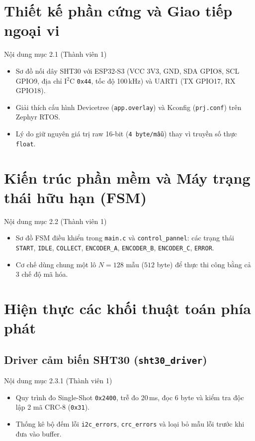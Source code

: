 \documentclass[12pt,a4paper]{report}
\begin{document}
\section{Thiết kế phần cứng và Giao tiếp ngoại vi}
\begin{notebox}{Nội dung mục 2.1 (Thành viên 1)}
\begin{itemize}[leftmargin=*,nosep]
    \item Sơ đồ nối dây SHT30 với ESP32-S3 (VCC 3V3, GND, SDA GPIO8, SCL GPIO9, địa chỉ I$^2$C \texttt{0x44}, tốc độ 100\,kHz) và UART1 (TX GPIO17, RX GPIO18).
    \item Giải thích cấu hình Devicetree (\texttt{app.overlay}) và Kconfig (\texttt{prj.conf}) trên Zephyr RTOS.
    \item Lý do giữ nguyên giá trị raw 16-bit (\texttt{4 byte/mẫu}) thay vì truyền số thực \texttt{float}.
\end{itemize}
\end{notebox}

\section{Kiến trúc phần mềm và Máy trạng thái hữu hạn (FSM)}
\begin{notebox}{Nội dung mục 2.2 (Thành viên 1)}
\begin{itemize}[leftmargin=*,nosep]
    \item Sơ đồ FSM điều khiển trong \texttt{main.c} và \texttt{control\_pannel}: các trạng thái \texttt{START}, \texttt{IDLE}, \texttt{COLLECT}, \texttt{ENCODER\_A}, \texttt{ENCODER\_B}, \texttt{ENCODER\_C}, \texttt{ERROR}.
    \item Cơ chế dùng chung một lô $N=128$ mẫu ($512$ byte) để thực thi công bằng cả 3 chế độ mã hóa.
\end{itemize}
\end{notebox}

\section{Hiện thực các khối thuật toán phía phát}
\subsection{Driver cảm biến SHT30 (\texttt{sht30\_driver})}
\begin{notebox}{Nội dung mục 2.3.1 (Thành viên 1)}
\begin{itemize}[leftmargin=*,nosep]
    \item Quy trình đo Single-Shot \texttt{0x2400}, trễ đo 20\,ms, đọc 6 byte và kiểm tra độc lập 2 mã CRC-8 (\texttt{0x31}).
    \item Thống kê bộ đếm lỗi \texttt{i2c\_errors}, \texttt{crc\_errors} và loại bỏ mẫu lỗi trước khi đưa vào buffer.
\end{itemize}
\end{notebox}
\end{document}

